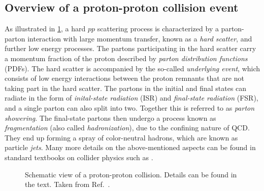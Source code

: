
\subsection{Overview of a proton-proton collision event}
\label{subsec:pp-collision-overview}
As illustrated in \cref{fig:ppcol}, a hard $pp$ scattering process is characterized by a parton-parton interaction with large momentum transfer, known as a \emph{hard scatter}, and further low energy processes.
The partons participating in the hard scatter carry a momentum fraction of the proton described by \emph{parton distribution functions} (PDFs).
The hard scatter is accompanied by the so-called \emph{underlying event}, which consists of low energy interactions between the proton remnants that are not taking part in the hard scatter.
The partons in the initial and final states can radiate in the form of \emph{inital-state radiation} (ISR) and \emph{final-state radiation} (FSR), and a single parton can also split into two. Together this is referred to as \emph{parton showering}.
The final-state partons then undergo a process known as \emph{fragmentation} (also called \emph{hadronization}), due to the confining nature of QCD. They end up forming a spray of color-neutral hadrons, which are known as particle \emph{jets}. Many more details on the above-mentioned aspects can be found in standard textbooks on collider physics such as . 

\begin{figure}[h]
  \caption[Schematic view of a proton-proton collision.]{Schematic view of a proton-proton collision. Details can be found in the text. Taken from Ref.~\cite{Bhatti2010}. }
  \label{fig:ppcol}
\end{figure}


